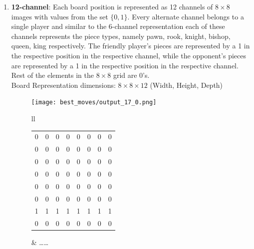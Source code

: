 \begin{enumerate}
\begin{figure}[H]
\begin{longtable}[width=\textwidth]{ll}
\begin{tabular}[width=0.33\textwidth]{|llllllll|}
    0  & 0  & 0  & 0  & 0  & 0  & 0  & 0  \\
    0  & 0  & 0  & 0  & 0  & 0  & 0  & 0  \\
    0  & 0  & 0  & 0  & 1  & 0  & 0  & 0  \\ \hline
    \end{tabular}
  \end{longtable}
\caption{\textbf{6-channel representation} of the initial chess board position}
\small
Leftmost matrix represents the pawn channel. It is followed by the channels 
for Rook, Knight, Bishop and Queen and the rightmost matrix represents the 
king channel.
\end{figure}

\label{section:representation12}
\item\textbf{12-channel}: Each board position is represented as 12 channels of 
$8\times 8$ images with values from the set $\{0,1\}$. Every alternate channel 
belongs to a single player and similar to the 6-channel representation each of 
these channels represents the piece types, namely pawn, rook, knight, bishop, 
queen, king respectively. The friendly player's pieces are represented by a 1 
in 
the respective position in the respective channel, while the opponent's pieces 
are represented by a 1 in the respective position in the respective channel. 
Rest of the elements in the $8\times 8$ grid are 0's.\\
Board Representation dimensions: $8\times 8 \times 12$ (Width, Height, Depth)
\begin{figure}[H]
\centering
\texttt{[image: best\_moves/output\_17\_0.png]}
\begin{longtable}[width=\textwidth]{ll}
\small
   \begin{tabular}[width=0.33\textwidth]{|llllllll|}
    \hline
    0  & 0  & 0  & 0  & 0  & 0  & 0  & 0  \\
    0  & 0  & 0  & 0  & 0  & 0  & 0  & 0  \\
    0  & 0  & 0  & 0  & 0  & 0  & 0  & 0  \\
    0  & 0  & 0  & 0  & 0  & 0  & 0  & 0  \\
    0  & 0  & 0  & 0  & 0  & 0  & 0  & 0  \\
    0  & 0  & 0  & 0  & 0  & 0  & 0  & 0  \\
    1  & 1  & 1  & 1  & 1  & 1  & 1  & 1  \\
    0  & 0  & 0  & 0  & 0  & 0  & 0  & 0  \\ \hline
    \end{tabular}
    &
\dots\dots\hspace{0.2cm}

\end{longtable}
\end{figure}
\end{enumerate}
